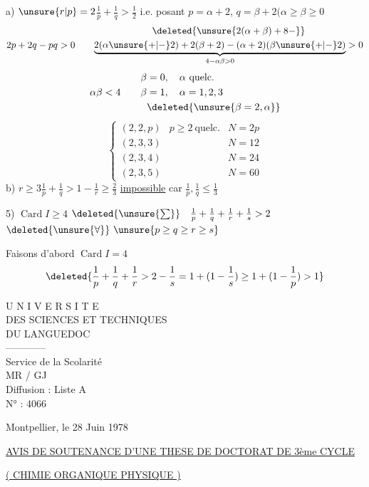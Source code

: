  a) $\unsure{r|p}=2$\qquad $\frac1p+\frac1q>\frac12$\qquad
 i.e. posant $p=\alpha+2$, $q=\beta+2$\qquad $(\alpha\ge\beta\ge0$
\margin{\deleted{$\unsure{\alpha}$}}
\[
2p+2q-pq>0\qquad
\begin{gathered}
\deleted{\unsure{2(\alpha+\beta)+8-}}\\
\underbrace{2(\alpha\unsure{+|-}2)+2(\beta+2)-(\alpha+2)(\beta\unsure{+|-}2)}_{4-\alpha\beta>0}>0
\end{gathered}
\]
\[
\alpha\beta<4\qquad
\begin{aligned}
\beta&=0,\quad\alpha\ \text{quelc.}\\
\beta&=1,\quad\alpha=1,2,3\\
&\deleted{\unsure{\beta=2,\alpha}}
\end{aligned}
\]
\[
\left\{\begin{array}{lll}
(2,2,p)&p\ge2\ \text{quelc.}&N=2p\\
(2,3,3)&&N=12\\
(2,3,4)&&N=24\\
(2,3,5)&&N=60
\end{array}\right.
\]
b) $r\ge3$\qquad $\frac1p+\frac1q>1-\frac1r\ge\frac23$\qquad
\uline{impossible} car $\frac1p,\frac1q\le\frac13$

5) $\operatorname{Card}I\ge4$\qquad
$\deleted{\unsure{\sum}}\quad\frac1p+\frac1q+\frac1r+\frac1s>2$\qquad
$\deleted{\unsure{\forall}}\ \unsure{p\ge q\ge r\ge s}$

Faisons d'abord $\operatorname{Card}I=4$
\[
\deleted{\frac1p+\frac1q+\frac1r>2-\frac1s=1+(1-\frac1s)\ge1+(1-\frac1p)>1}
\]

\begin{minipage}{.45\linewidth}\centering
U N I V E R S I T E\\
DES SCIENCES ET TECHNIQUES\\
DU LANGUEDOC\\
------------\\
Service de la Scolarité\\
MR / GJ\\
Diffusion : Liste A\\
N° : 4066
\end{minipage}\hfill
\begin{minipage}{.48\linewidth}
Montpellier, le 28 Juin 1978
\end{minipage}

\begin{center}
\uline{AVIS DE SOUTENANCE D'UNE THESE DE DOCTORAT DE 3ème CYCLE}

\uline{( CHIMIE ORGANIQUE PHYSIQUE )}
\end{center}

